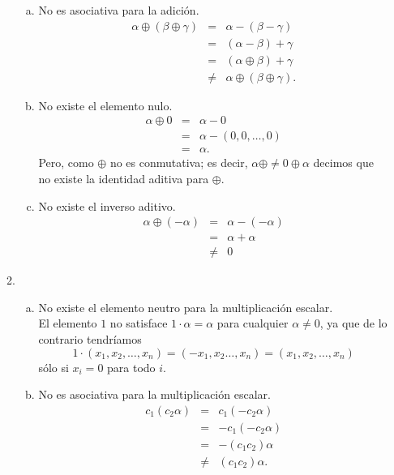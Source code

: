 \begin{enumerate}[\bfseries 1.]
\begin{enumerate}[(1)]
\begin{enumerate}[(a)]
		    \item No es asociativa para la adición.
			$$
			\begin{array}{rcl}
			    \alpha\oplus (\beta\oplus \gamma) &=& \alpha-(\beta-\gamma)\\
							      &=& (\alpha-\beta)+\gamma \\
							      &=& (\alpha\oplus \beta)+\gamma\\
							      &\neq& \alpha\oplus (\beta\oplus \gamma).

			\end{array}
			$$
		    \item No existe el elemento nulo.\\
			$$
			\begin{array}{rcl}
			    \alpha\oplus 0 &=& \alpha-0\\
					   &=&\alpha-(0,0,\ldots,0)\\
					   &=& \alpha.
			\end{array}
			$$
			Pero, como $\oplus$ no es conmutativa; es decir, $\alpha\oplus \neq 0\oplus \alpha$ decimos que no existe la identidad aditiva para $\oplus.$\\
			
		    \item No existe el inverso aditivo.
			$$
			\begin{array}{rcl}
			    \alpha\oplus(-\alpha) & = & \alpha - (-\alpha)\\
						  & = & \alpha + \alpha\\
						  &\neq & 0
			\end{array}
			$$

		\end{enumerate}

	    \item 
		\begin{enumerate}[(a)]
		    \item No existe el elemento neutro para la multiplicación escalar.\\
			El elemento $1$ no satisface $1\cdot \alpha=\alpha$ para cualquier $\alpha\neq 0$, ya que de lo contrario tendríamos 
			$$1\cdot(x_1,x_2,\ldots,x_n)=(-x_1,x_2\ldots,x_n)=(x_1,x_2,\ldots,x_n)$$
			sólo si $x_i=0$ para todo $i$.\\

		    \item No es asociativa para la multiplicación escalar.\\
			$$
			\begin{array}{rcl}
			    c_1(c_2\alpha) & = & c_1(-c_2\alpha)\\
					   & = & -c_1(-c_2\alpha)\\
					   & = & -(c_1c_2)\alpha\\
					   & \neq & (c_1c_2)\alpha.
			\end{array}
			$$


\end{enumerate}
\end{enumerate}
\end{enumerate}
